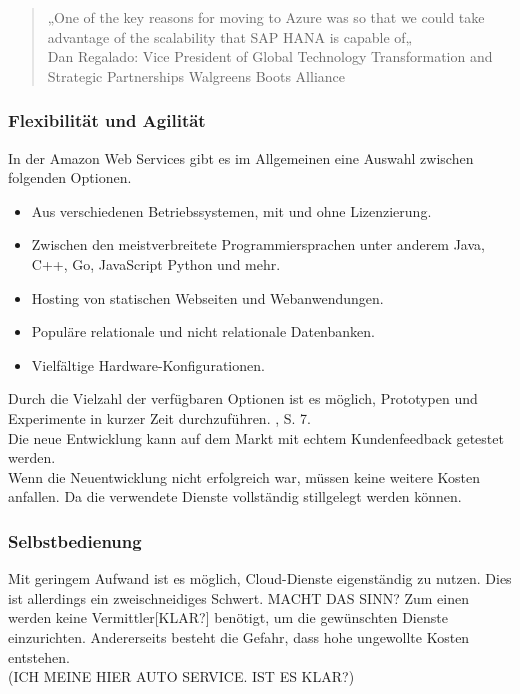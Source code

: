 \begin{quote}
      „One of the key reasons for moving to Azure was so that we could take advantage of the scalability that SAP HANA is capable of„
      \\
      Dan Regalado: Vice President of Global Technology Transformation and Strategic Partnerships Walgreens Boots Alliance
            {\cite{AZU01}}
\end{quote}

\subsubsection{Flexibilität und Agilität}
In der Amazon Web Services gibt es im Allgemeinen eine Auswahl zwischen folgenden Optionen.
\begin{itemize}
      \item
            Aus verschiedenen Betriebssystemen, mit und ohne Lizenzierung.
      \item
            Zwischen den meistverbreitete Programmiersprachen unter anderem Java, C++, Go, JavaScript Python und mehr.{\cite{AMZ03}}

      \item
            Hosting von statischen Webseiten und Webanwendungen.
            {\cite{AMZ04}}

      \item
            Populäre relationale und nicht relationale Datenbanken.
            {\cite{AMZ10}}
      \item
            Vielfältige Hardware-Konfigurationen.

\end{itemize}
\begin{flushleft}
      Durch die Vielzahl der verfügbaren Optionen ist es möglich, Prototypen und Experimente in kurzer Zeit durchzuführen.
      {\cite{IDC01}}, S. 7.
      \\
      Die neue Entwicklung kann auf dem Markt mit echtem Kundenfeedback getestet werden.
      \\
      Wenn die Neuentwicklung nicht erfolgreich war, müssen keine weitere Kosten anfallen.
      Da die verwendete Dienste vollständig stillgelegt werden können.
\end{flushleft}

\subsubsection{Selbstbedienung}
Mit geringem Aufwand ist es möglich, Cloud-Dienste eigenständig zu nutzen. Dies ist allerdings ein zweischneidiges Schwert.
MACHT DAS SINN?
Zum einen werden keine Vermittler[KLAR?] benötigt, um die gewünschten Dienste einzurichten. Andererseits besteht die Gefahr, dass hohe ungewollte Kosten entstehen.
\\ (ICH MEINE HIER AUTO SERVICE. IST ES KLAR?)

